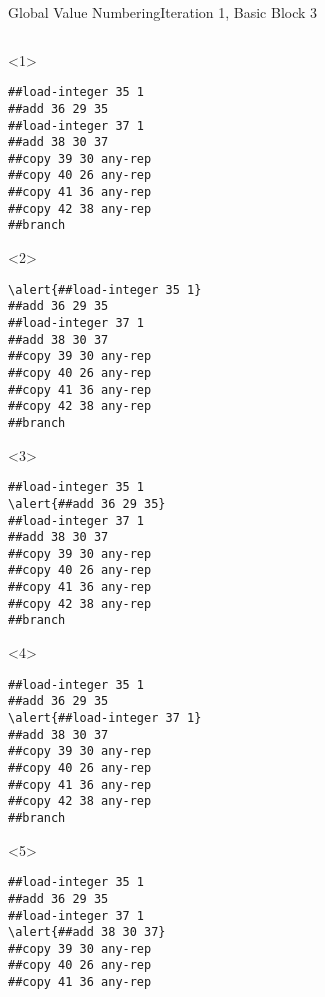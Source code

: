 \documentclass{beamer}
\begin{document}
\begin{frame}[fragile]{Global Value Numbering}{Iteration 1, Basic Block 3}
  \footnotesize
  \begin{columns}[t,onlytextwidth]
    \begin{column}[t]{.5\textwidth}
      \begin{onlyenv}<1>
        \begin{Verbatim}[frame=single,commandchars=\\\{\}]
##load-integer 35 1
##add 36 29 35
##load-integer 37 1
##add 38 30 37
##copy 39 30 any-rep
##copy 40 26 any-rep
##copy 41 36 any-rep
##copy 42 38 any-rep
##branch
        \end{Verbatim}
      \end{onlyenv}
      \begin{onlyenv}<2>
        \begin{Verbatim}[frame=single,commandchars=\\\{\}]
\alert{##load-integer 35 1}
##add 36 29 35
##load-integer 37 1
##add 38 30 37
##copy 39 30 any-rep
##copy 40 26 any-rep
##copy 41 36 any-rep
##copy 42 38 any-rep
##branch
        \end{Verbatim}
      \end{onlyenv}
      \begin{onlyenv}<3>
        \begin{Verbatim}[frame=single,commandchars=\\\{\}]
##load-integer 35 1
\alert{##add 36 29 35}
##load-integer 37 1
##add 38 30 37
##copy 39 30 any-rep
##copy 40 26 any-rep
##copy 41 36 any-rep
##copy 42 38 any-rep
##branch
        \end{Verbatim}
      \end{onlyenv}
      \begin{onlyenv}<4>
        \begin{Verbatim}[frame=single,commandchars=\\\{\}]
##load-integer 35 1
##add 36 29 35
\alert{##load-integer 37 1}
##add 38 30 37
##copy 39 30 any-rep
##copy 40 26 any-rep
##copy 41 36 any-rep
##copy 42 38 any-rep
##branch
        \end{Verbatim}
      \end{onlyenv}
      \begin{onlyenv}<5>
        \begin{Verbatim}[frame=single,commandchars=\\\{\}]
##load-integer 35 1
##add 36 29 35
##load-integer 37 1
\alert{##add 38 30 37}
##copy 39 30 any-rep
##copy 40 26 any-rep
##copy 41 36 any-rep

\end{Verbatim}
\end{onlyenv}
\end{column}
\end{columns}
\end{frame}
\end{document}
